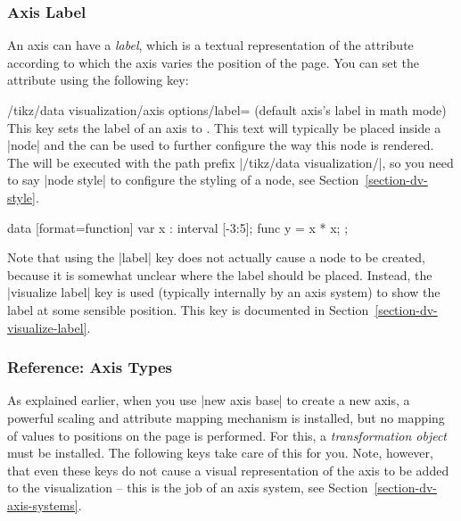 \subsubsection{Axis Label}

An axis can have a \emph{label}, which is a textual representation of the
attribute according to which the axis varies the position of the page. You can
set the attribute using the following key:

\begin{key}{/tikz/data visualization/axis options/label=
        (default \normalfont axis's label in math mode)%
}
    This key sets the label of an axis to . This text will typically
    be placed inside a |node| and the  can be used to further
    configure the way this node is rendered. The  will be
    executed with the path prefix |/tikz/data visualization/|, so you need to
    say |node style| to configure the styling of a node, see
    Section~\ref{section-dv-style}.
\begin{codeexample}[]
\tikz \datavisualization [
    scientific axes,
    x axis = {label, length=2.5cm},
    y axis = {label={[node style={fill=blue!20}]{$x^2$}}},
    visualize as smooth line]
 data [format=function] {
   var x : interval [-3:5];
   func y = \value x * \value x;
 };
\end{codeexample}
\end{key}

Note that using the |label| key does not actually cause a node to be created,
because it is somewhat unclear where the label should be placed. Instead, the
|visualize label| key is used (typically internally by an axis system) to show
the label at some sensible position. This key is documented in
Section~\ref{section-dv-visualize-label}.


\subsubsection{Reference: Axis Types}
\label{section-dv-reference-axis-types}

As explained earlier, when you use |new axis base| to create a new axis, a
powerful scaling and attribute mapping mechanism is installed, but no mapping
of values to positions on the page is performed. For this, a
\emph{transformation object} must be installed. The following keys take care of
this for you. Note, however, that even these keys do not cause a visual
representation of the axis to be added to the visualization -- this is the job
of an axis system, see Section~\ref{section-dv-axis-systems}.


